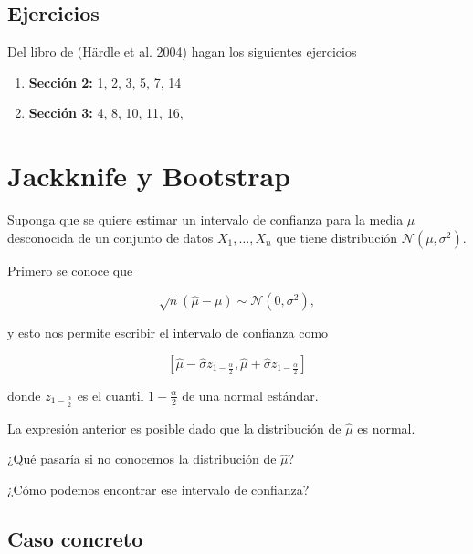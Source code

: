 \documentclass[
  12pt,
]{book}
\providecommand{\tightlist}{%
  \setlength{\itemsep}{0pt}\setlength{\parskip}{0pt}}
\begin{document}
\hypertarget{ejercicios}{%
\section{Ejercicios}\label{ejercicios}}

Del libro de (Härdle et al. 2004) hagan los siguientes ejercicios

\begin{enumerate}
\def\labelenumi{\arabic{enumi}.}
\tightlist
\item
  \textbf{Sección 2:} 1, 2, 3, 5, 7, 14
\item
  \textbf{Sección 3:} 4, 8, 10, 11, 16,
\end{enumerate}

\hypertarget{jackknife-y-bootstrap}{%
\chapter{Jackknife y Bootstrap}\label{jackknife-y-bootstrap}}

Suponga que se quiere estimar un intervalo de confianza para la media
\(\mu\) desconocida de un conjunto de datos \(X_{1},\ldots, X_{n}\) que
tiene distribución \(\mathcal{N}\left(\mu ,\sigma^{2}\right)\).

Primero se conoce que

\begin{equation*}
\sqrt{n}\left( \hat{\mu} - \mu \right)
\sim \mathcal{N}\left(0,\sigma^{2}\right),
\end{equation*}

y esto nos permite escribir el intervalo de confianza como

\begin{equation*}
\left[ \hat{\mu} - \hat{\sigma}z_{1-\frac{\alpha}{2}} ,
\hat{\mu} + \hat{\sigma}z_{1-\frac{\alpha}{2}}\right]
\end{equation*}

donde \(z_{1-\frac{\alpha}{2}}\) es el cuantil \(1-\frac{\alpha}{2}\) de
una normal estándar.

La expresión anterior es posible dado que la distribución de
\(\hat{\mu}\) es normal.

¿Qué pasaría si no conocemos la distribución de \(\hat{\mu}\)?

¿Cómo podemos encontrar ese intervalo de confianza?

\hypertarget{caso-concreto}{%
\section{Caso concreto}\label{caso-concreto}}
\end{document}
